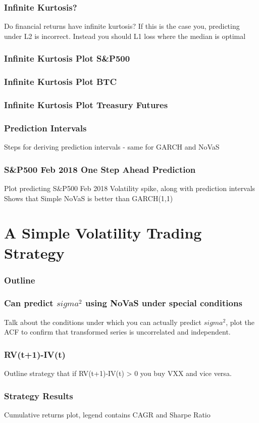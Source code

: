 \documentclass{beamer}
\begin{document}
\begin{frame}
\frametitle{Infinite Kurtosis?}
Do financial returns have infinite kurtosis?
If this is the case you, predicting under L2 is incorrect. Instead you should L1 loss where the median is optimal
\end{frame}

\begin{frame}
\frametitle{Infinite Kurtosis Plot S&P500}

\end{frame}

\begin{frame}
\frametitle{Infinite Kurtosis Plot BTC}

\end{frame}

\begin{frame}
\frametitle{Infinite Kurtosis Plot Treasury Futures}

\end{frame}

\begin{frame}
\frametitle{Prediction Intervals}
Steps for deriving prediction intervals - same for GARCH and NoVaS
\end{frame}

\begin{frame}
\frametitle{S&P500 Feb 2018 One Step Ahead Prediction}
Plot predicting S&P500 Feb 2018 Volatility spike, along with prediction intervals
Shows that Simple NoVaS is better than GARCH(1,1)
\end{frame}

\section{A Simple Volatility Trading Strategy}

\begin{frame}
\frametitle{Outline}
\tableofcontents[currentsection]
\end{frame}

\begin{frame}
\frametitle{Can predict $sigma^2$ using NoVaS under special conditions}
Talk about the conditions under which you can actually predict $sigma^2$, plot the ACF to confirm that transformed series is uncorrelated and independent.
\end{frame}

\begin{frame}
\frametitle{RV(t+1)-IV(t)}
Outline strategy that if RV(t+1)-IV(t) > 0 you buy VXX and vice versa.
\end{frame}

\begin{frame}
\frametitle{Strategy Results}
Cumulative returns plot, legend contains CAGR and Sharpe Ratio
\end{frame}
\end{document}
